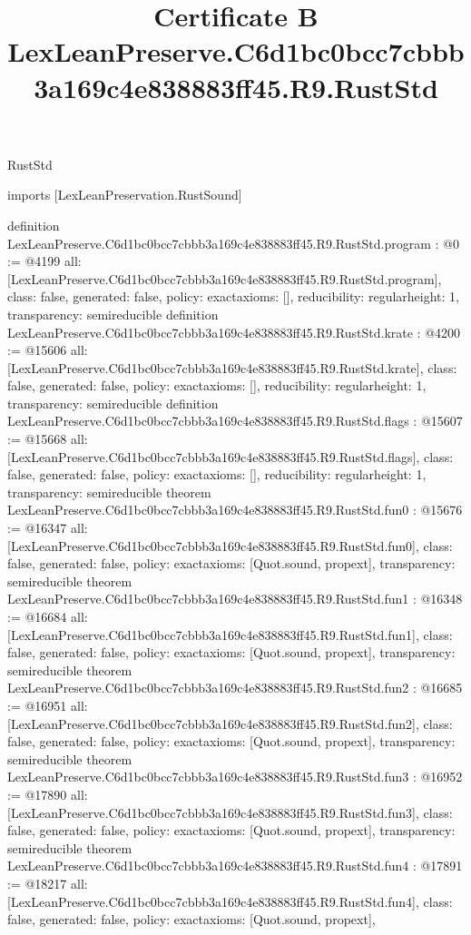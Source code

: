 \begin{lexlean}{RustStd}
\title{Certificate B LexLeanPreserve.C6d1bc0bcc7cbbb3a169c4e838883ff45.R9.RustStd}
\begin{coremodule}
imports [LexLeanPreservation.RustSound]

definition LexLeanPreserve.C6d1bc0bcc7cbbb3a169c4e838883ff45.R9.RustStd.program : @0 := @4199 {
  all: [LexLeanPreserve.C6d1bc0bcc7cbbb3a169c4e838883ff45.R9.RustStd.program],
  class: false,
  generated: false,
  policy: exact{axioms: []},
  reducibility: regular{height: 1},
  transparency: semireducible
}
definition LexLeanPreserve.C6d1bc0bcc7cbbb3a169c4e838883ff45.R9.RustStd.krate : @4200 := @15606 {
  all: [LexLeanPreserve.C6d1bc0bcc7cbbb3a169c4e838883ff45.R9.RustStd.krate],
  class: false,
  generated: false,
  policy: exact{axioms: []},
  reducibility: regular{height: 1},
  transparency: semireducible
}
definition LexLeanPreserve.C6d1bc0bcc7cbbb3a169c4e838883ff45.R9.RustStd.flags : @15607 := @15668 {
  all: [LexLeanPreserve.C6d1bc0bcc7cbbb3a169c4e838883ff45.R9.RustStd.flags],
  class: false,
  generated: false,
  policy: exact{axioms: []},
  reducibility: regular{height: 1},
  transparency: semireducible
}
theorem LexLeanPreserve.C6d1bc0bcc7cbbb3a169c4e838883ff45.R9.RustStd.fun0 : @15676 := @16347 {
  all: [LexLeanPreserve.C6d1bc0bcc7cbbb3a169c4e838883ff45.R9.RustStd.fun0],
  class: false,
  generated: false,
  policy: exact{axioms: [Quot.sound, propext]},
  transparency: semireducible
}
theorem LexLeanPreserve.C6d1bc0bcc7cbbb3a169c4e838883ff45.R9.RustStd.fun1 : @16348 := @16684 {
  all: [LexLeanPreserve.C6d1bc0bcc7cbbb3a169c4e838883ff45.R9.RustStd.fun1],
  class: false,
  generated: false,
  policy: exact{axioms: [Quot.sound, propext]},
  transparency: semireducible
}
theorem LexLeanPreserve.C6d1bc0bcc7cbbb3a169c4e838883ff45.R9.RustStd.fun2 : @16685 := @16951 {
  all: [LexLeanPreserve.C6d1bc0bcc7cbbb3a169c4e838883ff45.R9.RustStd.fun2],
  class: false,
  generated: false,
  policy: exact{axioms: [Quot.sound, propext]},
  transparency: semireducible
}
theorem LexLeanPreserve.C6d1bc0bcc7cbbb3a169c4e838883ff45.R9.RustStd.fun3 : @16952 := @17890 {
  all: [LexLeanPreserve.C6d1bc0bcc7cbbb3a169c4e838883ff45.R9.RustStd.fun3],
  class: false,
  generated: false,
  policy: exact{axioms: [Quot.sound, propext]},
  transparency: semireducible
}
theorem LexLeanPreserve.C6d1bc0bcc7cbbb3a169c4e838883ff45.R9.RustStd.fun4 : @17891 := @18217 {
  all: [LexLeanPreserve.C6d1bc0bcc7cbbb3a169c4e838883ff45.R9.RustStd.fun4],
  class: false,
  generated: false,
  policy: exact{axioms: [Quot.sound, propext]},
}
\end{coremodule}
\end{lexlean}

